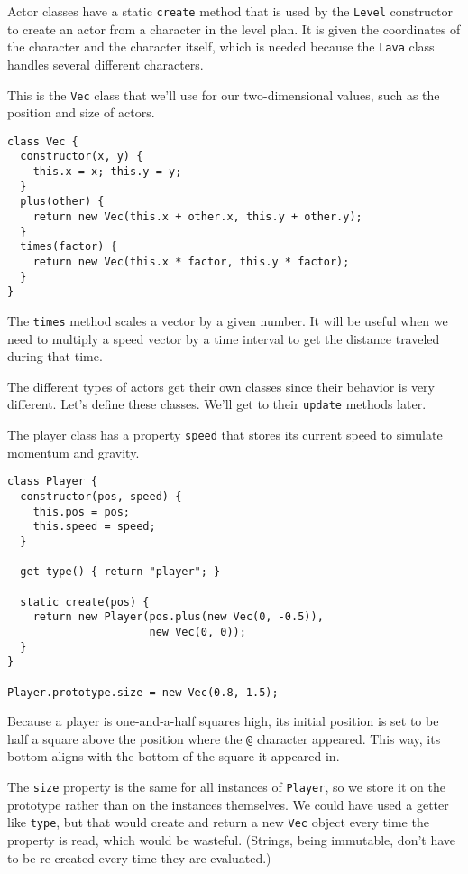 Actor classes have a static \lstinline`create` method that is used by the \lstinline`Level` constructor to create an actor from a character in the level plan. It is given the coordinates of the character and the character itself, which is needed because the \lstinline`Lava` class handles several different characters.

\label{game.vector}This is the \lstinline`Vec` class that we'll use for our two-dimensional values, such as the position and size of actors.

\begin{lstlisting}
class Vec {
  constructor(x, y) {
    this.x = x; this.y = y;
  }
  plus(other) {
    return new Vec(this.x + other.x, this.y + other.y);
  }
  times(factor) {
    return new Vec(this.x * factor, this.y * factor);
  }
}
\end{lstlisting}
\noindent{}

The \lstinline`times` method scales a vector by a given number. It will be useful when we need to multiply a speed vector by a time interval to get the distance traveled during that time.

The different types of actors get their own classes since their behavior is very different. Let's define these classes. We'll get to their \lstinline`update` methods later.

The player class has a property \lstinline`speed` that stores its current speed to simulate momentum and gravity.

\begin{lstlisting}
class Player {
  constructor(pos, speed) {
    this.pos = pos;
    this.speed = speed;
  }

  get type() { return "player"; }

  static create(pos) {
    return new Player(pos.plus(new Vec(0, -0.5)),
                      new Vec(0, 0));
  }
}

Player.prototype.size = new Vec(0.8, 1.5);
\end{lstlisting}
\noindent

Because a player is one-and-a-half squares high, its initial position is set to be half a square above the position where the \lstinline`@` character appeared. This way, its bottom aligns with the bottom of the square it appeared in.

The \lstinline`size` property is the same for all instances of \lstinline`Player`, so we store it on the prototype rather than on the instances themselves. We could have used a getter like \lstinline`type`, but that would create and return a new \lstinline`Vec` object every time the property is read, which would be wasteful. (Strings, being immutable, don't have to be re-created every time they are evaluated.)

